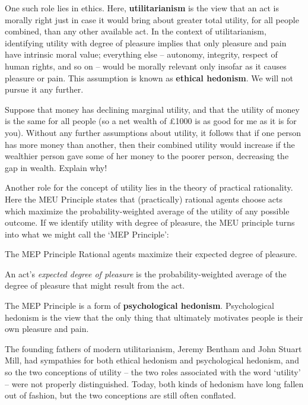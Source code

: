 One such role lies in ethics. Here, \textbf{utilitarianism} is the
view that an act is morally right just in case it would bring about
greater total utility, for all people combined, than any other
available act. In the context of utilitarianism, identifying utility
with degree of pleasure implies that only pleasure and pain have
intrinsic moral value; everything else -- autonomy, integrity, respect
of human rights, and so on -- would be morally relevant only insofar
as it causes pleasure or pain. This assumption is known as \textbf{ethical
  hedonism}. We will not pursue it any further.

\begin{exercise1}
  Suppose that money has declining marginal utility, and that the
  utility of money is the same for all people (so a net wealth of
  £1000 is as good for me as it is for you). Without any further
  assumptions about utility, it follows that if one person has more
  money than another, then their combined utility would increase if
  the wealthier person gave some of her money to the poorer person,
  decreasing the gap in wealth. Explain why!
\end{exercise1}

Another role for the concept of utility lies in the theory of
practical rationality. Here the MEU Principle states that
(practically) rational agents choose acts which maximize the
probability-weighted average of the utility of any possible outcome.
If we identify utility with degree of pleasure, the MEU principle
turns into what we might call the `MEP Principle':
%
\begin{genericthm}{The MEP Principle}
  Rational agents maximize their expected degree of pleasure. 
\end{genericthm}
%
An act's \emph{expected degree of pleasure} is the
probability-weighted average of the degree of pleasure that might
result from the act. 

The MEP Principle is a form of \textbf{psychological
  hedonism}. Psychological hedonism is the view that the only thing
that ultimately motivates people is their own pleasure and pain.

The founding fathers of modern utilitarianism, Jeremy Bentham and John
Stuart Mill, had sympathies for both ethical hedonism and
psychological hedonism, and so the two conceptions of utility -- the
two roles associated with the word `utility' -- were not properly
distinguished. Today, both kinds of hedonism have long fallen out of
fashion, but the two conceptions are still often conflated.

